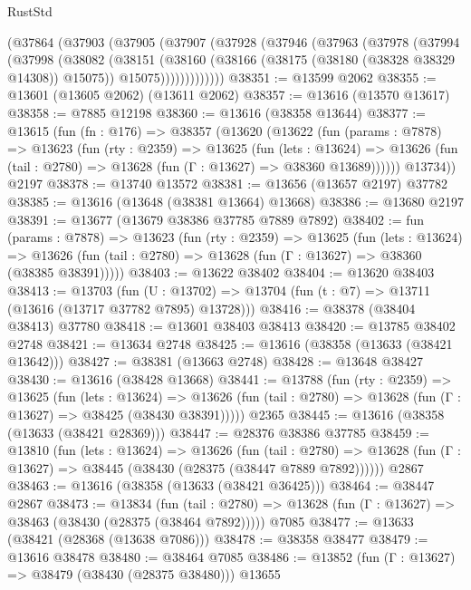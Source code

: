 \begin{lexlean}{RustStd}
\begin{coremodule}
    (@37864
      (@37903
        (@37905
          (@37907
            (@37928
              (@37946
                (@37963
                  (@37978
                    (@37994
                      (@37998
                        (@38082
                          (@38151
                            (@38160
                              (@38166 (@38175 (@38180 (@38328 @38329 @14308)) @15075))
                              @15075)))))))))))))
@38351 := @13599 @2062
@38355 := @13601 (@13605 @2062) (@13611 @2062)
@38357 := @13616 (@13570 @13617)
@38358 := @7885 @12198
@38360 := @13616 (@38358 @13644)
@38377 := @13615
    (fun (fn : @176) =>
    @38357
      (@13620
        (@13622
          (fun (params : @7878) =>
          @13623
            (fun (rty : @2359) =>
            @13625
              (fun (lets : @13624) =>
              @13626 (fun (tail : @2780) => @13628 (fun (Γ : @13627) => @38360 @13689))))))
        @13734))
    @2197
@38378 := @13740 @13572
@38381 := @13656 (@13657 @2197) @37782
@38385 := @13616 (@13648 (@38381 @13664) @13668)
@38386 := @13680 @2197
@38391 := @13677 (@13679 @38386 @37785 @7889 @7892)
@38402 := fun (params : @7878) =>
  @13623
    (fun (rty : @2359) =>
    @13625
      (fun (lets : @13624) =>
      @13626 (fun (tail : @2780) => @13628 (fun (Γ : @13627) => @38360 (@38385 @38391)))))
@38403 := @13622 @38402
@38404 := @13620 @38403
@38413 := @13703
    (fun (U : @13702) => @13704 (fun (t : @7) => @13711 (@13616 (@13717 @37782 @7895) @13728)))
@38416 := @38378 (@38404 @38413) @37780
@38418 := @13601 @38403 @38413
@38420 := @13785 @38402 @2748
@38421 := @13634 @2748
@38425 := @13616 (@38358 (@13633 (@38421 @13642)))
@38427 := @38381 (@13663 @2748)
@38428 := @13648 @38427
@38430 := @13616 (@38428 @13668)
@38441 := @13788
    (fun (rty : @2359) =>
    @13625
      (fun (lets : @13624) =>
      @13626 (fun (tail : @2780) => @13628 (fun (Γ : @13627) => @38425 (@38430 @38391)))))
    @2365
@38445 := @13616 (@38358 (@13633 (@38421 @28369)))
@38447 := @28376 @38386 @37785
@38459 := @13810
    (fun (lets : @13624) =>
    @13626
      (fun (tail : @2780) =>
      @13628 (fun (Γ : @13627) => @38445 (@38430 (@28375 (@38447 @7889 @7892))))))
    @2867
@38463 := @13616 (@38358 (@13633 (@38421 @36425)))
@38464 := @38447 @2867
@38473 := @13834
    (fun (tail : @2780) => @13628 (fun (Γ : @13627) => @38463 (@38430 (@28375 (@38464 @7892)))))
    @7085
@38477 := @13633 (@38421 (@28368 (@13638 @7086)))
@38478 := @38358 @38477
@38479 := @13616 @38478
@38480 := @38464 @7085
@38486 := @13852 (fun (Γ : @13627) => @38479 (@38430 (@28375 @38480))) @13655

\end{coremodule}
\end{lexlean}
